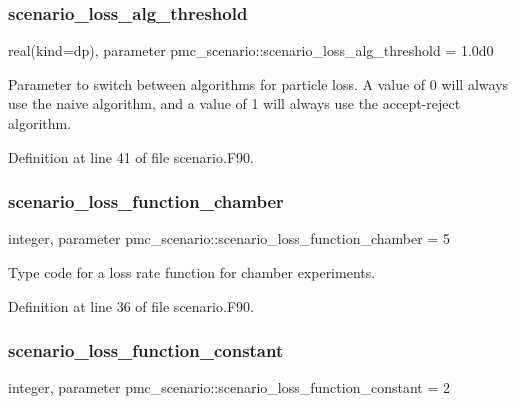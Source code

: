 \subsubsection{\texorpdfstring{scenario\+\_\+loss\+\_\+alg\+\_\+threshold}{scenario\_loss\_alg\_threshold}}
{\footnotesize\ttfamily real(kind=dp), parameter pmc\+\_\+scenario\+::scenario\+\_\+loss\+\_\+alg\+\_\+threshold = 1.\+0d0}



Parameter to switch between algorithms for particle loss. A value of 0 will always use the naive algorithm, and a value of 1 will always use the accept-\/reject algorithm. 



Definition at line 41 of file scenario.\+F90.

\mbox{\label{namespacepmc__scenario_a0e9c46d308800f28d977960a1d5918ae}} 
\subsubsection{\texorpdfstring{scenario\+\_\+loss\+\_\+function\+\_\+chamber}{scenario\_loss\_function\_chamber}}
{\footnotesize\ttfamily integer, parameter pmc\+\_\+scenario\+::scenario\+\_\+loss\+\_\+function\+\_\+chamber = 5}



Type code for a loss rate function for chamber experiments. 



Definition at line 36 of file scenario.\+F90.

\mbox{\label{namespacepmc__scenario_a860cf47bb81e54f7ef8bc666bf7c76f0}} 
\subsubsection{\texorpdfstring{scenario\+\_\+loss\+\_\+function\+\_\+constant}{scenario\_loss\_function\_constant}}
{\footnotesize\ttfamily integer, parameter pmc\+\_\+scenario\+::scenario\+\_\+loss\+\_\+function\+\_\+constant = 2}



